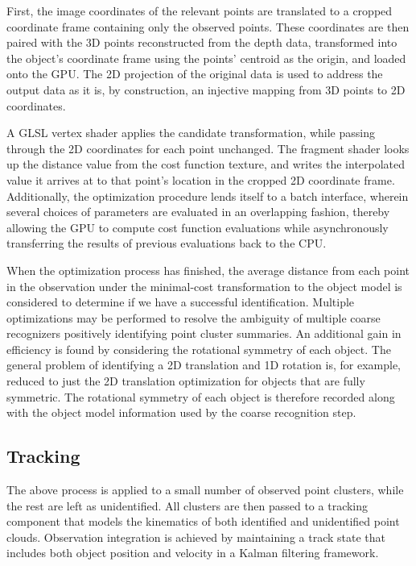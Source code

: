 \documentclass[letterpaper, 10 pt, conference]{ieeeconf}  %
\begin{document}
First, the image coordinates of the relevant points are translated to
a cropped coordinate frame containing only the observed points. These
coordinates are then paired with the 3D points reconstructed from the
depth data, transformed into the object's coordinate frame using the
points' centroid as the origin, and loaded onto the GPU. The 2D
projection of the original data is used to address the output data as
it is, by construction, an injective mapping from 3D points to 2D
coordinates.

A GLSL vertex shader applies the candidate transformation, while
passing through the 2D coordinates for each point unchanged. The
fragment shader looks up the distance value from the cost function
texture, and writes the interpolated value it arrives at to that
point's location in the cropped 2D coordinate frame. Additionally, the
optimization procedure lends itself to a batch interface, wherein
several choices of parameters are evaluated in an overlapping fashion,
thereby allowing the GPU to compute cost function evaluations while
asynchronously transferring the results of previous evaluations back
to the CPU.

When the optimization process has finished, the average distance from
each point in the observation under the minimal-cost transformation to
the object model is considered to determine if we have a successful
identification. Multiple optimizations may be performed to resolve the
ambiguity of multiple coarse recognizers positively identifying point
cluster summaries. An additional gain in efficiency is found by
considering the rotational symmetry of each object. The general
problem of identifying a 2D translation and 1D rotation is, for
example, reduced to just the 2D translation optimization for objects
that are fully symmetric. The rotational symmetry of each object is
therefore recorded along with the object model information used by the
coarse recognition step.

\subsection{Tracking}
The above process is applied to a small number of observed point
clusters, while the rest are left as unidentified. All clusters are
then passed to a tracking component that models the kinematics of both
identified and unidentified point clouds. Observation integration is
achieved by maintaining a track state that includes both object
position and velocity in a Kalman filtering framework.
\end{document}

